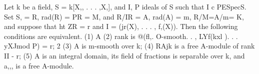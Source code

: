 \begin{theorem}[Theorem 30.3]\label{mcrt-auto-theorem-30-3}
\begin{mathematicalrecord}
Let k be a field, S = k[X,, . . . ,X,], and I, P ideals of S such
that I c PESpecS. Set
           S, = R, rad(R) = PR = M, and R/IR = A, rad(A) = m,
           R/M=A/m=          K,
and suppose that ht ZR = r and I = (jr(X), . . . , f,(X)). Then the following
conditions are equivalent.
   (1) A
   (2) rank
          is @(fl,.
             O-smooth. . , LYf(kxl ). . . yXJmod P) = r;
                                  2
   (3) A is m-smooth over k;
   (4) RAjk is a free A-module of rank II - r;
   (5) A is an integral domain, its field of fractions is separable over k, and
a,,, is a free A-module.
\end{mathematicalrecord}
\end{theorem}
